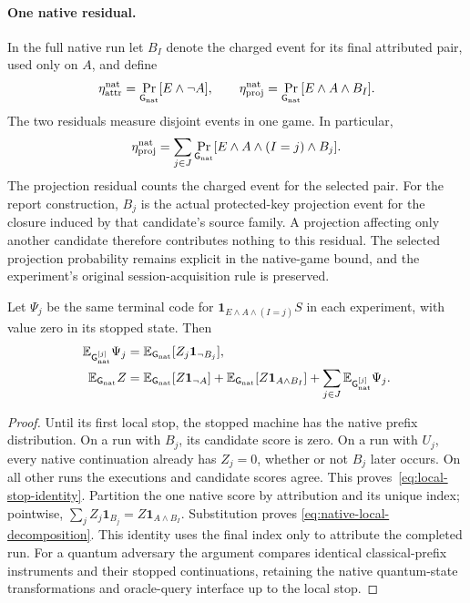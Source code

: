 \paragraph{One native residual.}
In the full native run let $B_I$ denote the charged event for its final
attributed pair, used only on $A$, and define
\[
 \eta_{\rm attr}^{\rm nat}=\Pr_{\mathsf G_{\rm nat}}[E\land\neg A],
 \qquad
 \eta_{\rm proj}^{\rm nat}=\Pr_{\mathsf G_{\rm nat}}[E\land A\land B_I].
\]
The two residuals measure disjoint events in one game. In particular,
\[
 \eta_{\rm proj}^{\rm nat}
 =\sum_{j\in J}\Pr_{\mathsf G_{\rm nat}}
       [E\land A\land(I=j)\land B_j].
\]
The projection residual counts the charged event for the selected pair. For
the report construction, $B_j$ is the actual protected-key projection event
for the closure induced by that candidate's source family. A projection
affecting only another candidate therefore contributes nothing to this
residual. The selected projection probability remains explicit in the
native-game bound, and the experiment's original session-acquisition rule
is preserved.

\begin{lemma}
\label{lem:native-local-score}
Let $\Psi_j$ be the same terminal code for
$\mathbf1_{E\land A\land(I=j)}S$ in each experiment, with value zero in its
stopped state.  Then
\begin{align}
 \mathbb E_{\mathsf G_{\rm nat}^{[j]}}\Psi_j
   &=\mathbb E_{\mathsf G_{\rm nat}}
           [Z_j\mathbf1_{\neg B_j}], \label{eq:local-stop-identity}\\
 \mathbb E_{\mathsf G_{\rm nat}}Z
   &=\mathbb E_{\mathsf G_{\rm nat}}[Z\mathbf1_{\neg A}]
     +\mathbb E_{\mathsf G_{\rm nat}}[Z\mathbf1_{A\land B_I}]
     +\sum_{j\in J}
       \mathbb E_{\mathsf G_{\rm nat}^{[j]}}\Psi_j.
       \label{eq:native-local-decomposition}
\end{align}
\end{lemma}
\begin{proof}
Until its first local stop, the stopped machine has the native prefix
distribution.  On a run with $B_j$, its candidate score is zero.  On a run
with $U_j$, every native continuation already has $Z_j=0$, whether or not
$B_j$ later occurs.  On all other runs the executions and candidate scores
agree.  This proves~\eqref{eq:local-stop-identity}.  Partition the one native
score by attribution and its unique index; pointwise,
$\sum_j Z_j\mathbf1_{B_j}=Z\mathbf1_{A\land B_I}$.  Substitution proves
\eqref{eq:native-local-decomposition}. This identity uses the final index
only to attribute the completed run. For a quantum adversary the
argument compares identical classical-prefix instruments and their stopped
continuations, retaining the native quantum-state transformations and
oracle-query interface up to the local stop.
\end{proof}

